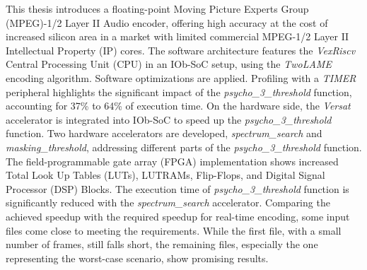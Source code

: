\hspace{0.4cm} This thesis introduces a floating-point Moving Picture Experts Group (MPEG)-1/2 Layer II Audio encoder, offering high accuracy at the cost of increased silicon area in a market with limited commercial MPEG-1/2 Layer II Intellectual Property (IP) cores.
The software architecture features the \textit{VexRiscv} Central Processing Unit (CPU) in an IOb-SoC setup, using the \textit{TwoLAME} encoding algorithm. Software optimizations are applied. Profiling with a \textit{TIMER} peripheral highlights the significant impact of the \textit{psycho\_3\_threshold} function, accounting for 37\% to 64\% of execution time.
On the hardware side, the \textit{Versat} accelerator is integrated into IOb-SoC to speed up the \textit{psycho\_3\_threshold} function. Two hardware accelerators are developed, \textit{spectrum\_search} and \textit{masking\_threshold}, addressing different parts of the \textit{psycho\_3\_threshold} function. The field-programmable gate array (FPGA) implementation shows increased Total Look Up Tables (LUTs), LUTRAMs, Flip-Flops, and Digital Signal Processor (DSP) Blocks.
The execution time of \textit{psycho\_3\_threshold} function is significantly reduced with the \textit{spectrum\_search} accelerator.
Comparing the achieved speedup with the required speedup for real-time encoding, some input files come close to meeting the requirements. While the first file, with a small number of frames, still falls short, the remaining files, especially the one representing the worst-case scenario, show promising results.